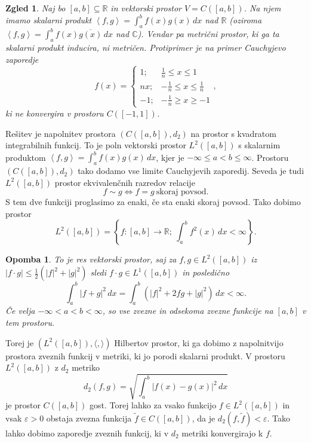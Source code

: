 \documentclass[10pt, a4paper]{article}
\newtheorem*{opomba}{Opomba}
\newtheorem{zgled}{Zgled}[section]
\newcommand{\R}{\mathbb {R}}
\newcommand{\C}{\mathbb {C}}
\newcommand{\sprod}[2]{\left\langle {#1},{#2} \right\rangle}
\begin{document}
\begin{zgled}\label{zgl:5}
    Naj bo $[a, b] \subseteq \R$ in vektorski prostor $V = C([a, b])$.
    Na njem imamo skalarni produkt $\sprod{f}{g} = \int_a ^b f(x) g(x)\, dx$ nad $\R$
    (oziroma $\sprod{f}{g} = \int_a ^b f(x) \overline{g(x)}\, dx$ nad $\C$).
    Vendar pa metrični prostor, ki ga ta skalarni produkt inducira, ni metričen.
    Protiprimer je na primer Cauchyjevo zaporedje 
    $$f(x) = \begin{cases}
        1; & \frac{1}{n} \leq x \leq 1\\
        nx; & -\frac{1}{n} \leq x \leq \frac{1}{n}\\
        -1; & -\frac{1}{n} \geq x \geq -1
    \end{cases},$$
    ki ne konvergira v prostoru $C([-1, 1])$.
\end{zgled}


Rešitev je napolnitev prostora $(C([a, b]), d_2)$ na prostor s kvadratom integrabilnih funkcij.
To je poln vektorski prostor $L^2 ([a, b])$ s skalarnim produktom 
$\sprod{f}{g} = \int_a ^b f(x) g(x)\, dx$, kjer je $-\infty \leq a < b \leq \infty$.
Prostoru $(C([a, b]), d_2)$ tako dodamo vse limite Cauchyjevih zaporedij.
Seveda je tudi $L^2 ([a, b])$ prostor ekvivalenčnih razredov relacije $$f \sim g \Leftrightarrow f = g\ \mathrm{\text{skoraj povsod}}.$$
S tem dve funkciji proglasimo za enaki, če sta enaki skoraj povsod. Tako dobimo prostor 
$$L^2 ([a, b]) = \left\lbrace f: [a, b] \to \R;\ \int_a ^b f^2 (x)\, dx < \infty\right\rbrace.$$
\vspace*{-5mm}
\begin{opomba}
    To je res vektorski prostor, saj za $f, g \in L^2 ([a, b])$ iz $|f \cdot g| \leq \frac{1}{2} (|f|^2 + |g|^2)$
sledi $f \cdot g \in L^1 ([a, b])$ in posledično 
$$\int_a ^b |f + g|^2 \, dx = \int_a ^b (|f|^2 + 2fg + |g|^2)\, dx < \infty.$$
Če velja $-\infty < a < b < \infty$, so vse zvezne in odsekoma zvezne funkcije na $[a, b]$ v tem prostoru.
\end{opomba}
Torej je $(L^2 ([a, b]), \langle , \rangle)$ Hilbertov prostor, ki ga dobimo z napolnitvijo prostora zveznih funkcij 
v metriki, ki jo porodi skalarni produkt. V prostoru $L^2 ([a, b])$ z $d_2$ metriko
$$d_2 (f, g) = \sqrt{\int_a ^b |f(x) - g(x)|^2\, dx}$$ je prostor $C([a, b])$ gost.
Torej lahko za vsako funkcijo $f \in L^2 ([a, b])$ in vsak $\varepsilon > 0$ obstaja zvezna funkcija 
$\widetilde{f} \in C([a, b])$, da je $d_2 (f, \widetilde{f}) < \varepsilon$.
Tako lahko dobimo zaporedje zveznih funkcij, ki v $d_2$ metriki konvergirajo k $f$.
\end{document}
